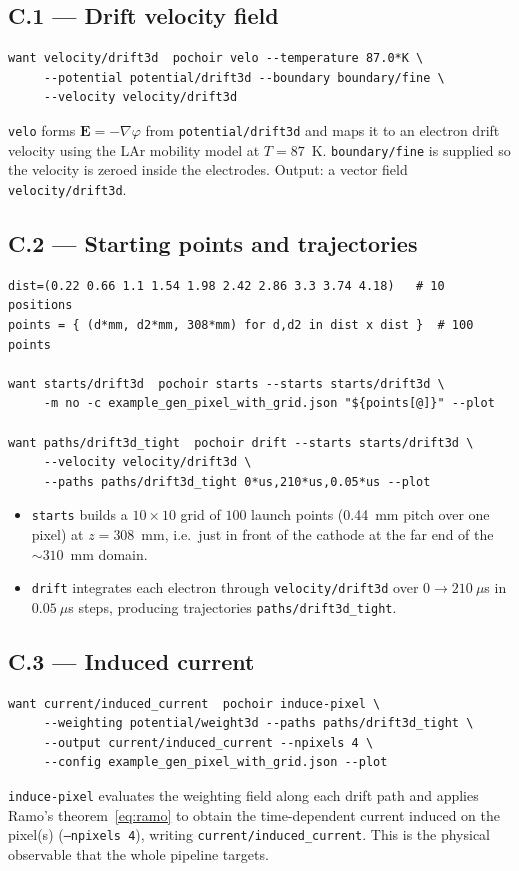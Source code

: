 \documentclass[11pt]{article}
\newcommand{\key}[1]{\texttt{#1}}
\newcommand{\cmd}[1]{\texttt{#1}}
\begin{document}
\subsection*{C.1 --- Drift velocity field}
\begin{lstlisting}
want velocity/drift3d  pochoir velo --temperature 87.0*K \
     --potential potential/drift3d --boundary boundary/fine \
     --velocity velocity/drift3d
\end{lstlisting}
\cmd{velo} forms $\mathbf{E}=-\nabla\varphi$ from \key{potential/drift3d}
and maps it to an electron drift velocity using the LAr mobility model at
$T=87$~K.  \key{boundary/fine} is supplied so the velocity is zeroed
inside the electrodes.  Output: a vector field \key{velocity/drift3d}.

\subsection*{C.2 --- Starting points and trajectories}
\begin{lstlisting}
dist=(0.22 0.66 1.1 1.54 1.98 2.42 2.86 3.3 3.74 4.18)   # 10 positions
points = { (d*mm, d2*mm, 308*mm) for d,d2 in dist x dist }  # 100 points

want starts/drift3d  pochoir starts --starts starts/drift3d \
     -m no -c example_gen_pixel_with_grid.json "${points[@]}" --plot

want paths/drift3d_tight  pochoir drift --starts starts/drift3d \
     --velocity velocity/drift3d \
     --paths paths/drift3d_tight 0*us,210*us,0.05*us --plot
\end{lstlisting}
\begin{itemize}
  \item \cmd{starts} builds a $10\times10$ grid of $100$ launch points
        (0.44~mm pitch over one pixel) at $z=308$~mm, i.e.\ just in front
        of the cathode at the far end of the $\sim310$~mm domain.
  \item \cmd{drift} integrates each electron through
        \key{velocity/drift3d} over $0\to210~\mu$s in $0.05~\mu$s steps,
        producing trajectories \key{paths/drift3d\_tight}.
\end{itemize}

\subsection*{C.3 --- Induced current}
\begin{lstlisting}
want current/induced_current  pochoir induce-pixel \
     --weighting potential/weight3d --paths paths/drift3d_tight \
     --output current/induced_current --npixels 4 \
     --config example_gen_pixel_with_grid.json --plot
\end{lstlisting}
\cmd{induce-pixel} evaluates the weighting field along each drift path and
applies Ramo's theorem~\eqref{eq:ramo} to obtain the time-dependent
current induced on the pixel(s) (\texttt{--npixels 4}), writing
\key{current/induced\_current}.  This is the physical observable that the
whole pipeline targets.
\end{document}
